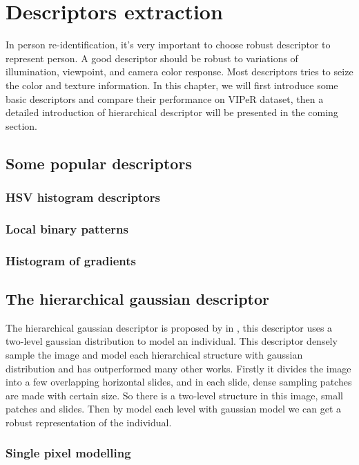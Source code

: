 \chapter{Descriptors extraction}
In person re-identification, it's very important to choose robust descriptor to represent person. A good descriptor should be robust to variations of illumination, viewpoint, and camera color response. Most descriptors tries to seize the color and texture information. In this chapter, we will first introduce some basic descriptors and compare their performance on VIPeR dataset, then a detailed introduction of hierarchical descriptor will be presented in the coming section.


\section{Some popular descriptors}
\subsection{HSV histogram descriptors}

\subsection{Local binary patterns}

\subsection{Histogram of gradients}

\section{The hierarchical gaussian descriptor}

The hierarchical gaussian descriptor is proposed by in  \cite{GOGpaper}, this descriptor uses a two-level gaussian distribution to model an individual. This descriptor densely sample the image and model each hierarchical structure with gaussian distribution and has outperformed many other works. Firstly it divides the image into a few overlapping horizontal slides, and in each slide, dense sampling patches are made with certain size. So there is a  two-level structure in this image, small patches and slides. Then by model each level with gaussian model we can get a robust representation of the individual.
\subsection{Single pixel modelling}


